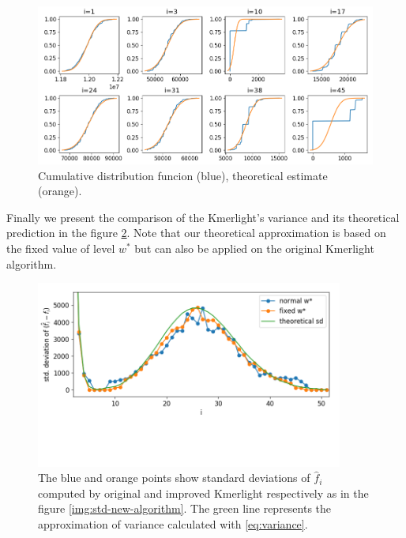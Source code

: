 \begin{figure}[h]
\centerline{\includegraphics[width=1\textwidth, trim={0cm, 0cm, 0cm, 0cm}, clip]{images/estimated-cdf.png}}
\caption[Distribution functions of $\hat f_i$]{Cumulative distribution funcion (blue), theoretical estimate (orange).}
\label{img:estimated-cdf}
\end{figure}

Finally we present the comparison of the Kmerlight's variance and its theoretical prediction in the
figure \ref{img:std-theory}. Note that our theoretical approximation is based on the fixed value of
level $w^*$ but can also be applied on the original Kmerlight algorithm. 

\begin{figure}[h]
\centerline{\includegraphics[width=0.9\textwidth, trim={0cm, 3.5cm, 0cm, 0cm}, clip]{images/std_deviations_comparison_theory.png}}
\caption[Experimental and theoretical variance of Kmerlight]{The blue and orange points show standard deviations of $\hat f_i$
computed by original and improved Kmerlight respectively as in the figure \ref{img:std-new-algorithm}. The green line 
represents the approximation of variance calculated with \ref{eq:variance}.}
\label{img:std-theory}
\end{figure}
